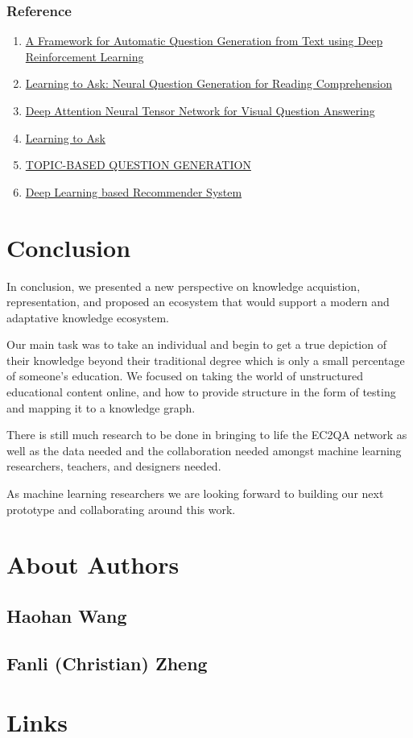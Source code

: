 \documentclass[]{book}
\theoremstyle{definition}
\theoremstyle{definition}
\theoremstyle{definition}
\theoremstyle{remark}
\begin{document}
\subsection{Reference}\label{reference}

\begin{enumerate}
\def\labelenumi{\arabic{enumi}.}
\item
  \href{https://arxiv.org/pdf/1808.04961.pdf}{A Framework for Automatic
  Question Generation from Text using Deep Reinforcement Learning}
\item
  \href{https://arxiv.org/pdf/1705.00106.pdf}{Learning to Ask: Neural
  Question Generation for Reading Comprehension}
\item
  \href{http://openaccess.thecvf.com/content_ECCV_2018/papers/Yalong_Bai_Deep_Attention_Neural_ECCV_2018_paper.pdf}{Deep
  Attention Neural Tensor Network for Visual Question Answering}
\item
  \href{http://www.cs.cornell.edu/~xdu/papers/acl17_dsc_poster.pdf}{Learning
  to Ask}
\item
  \href{https://openreview.net/pdf?id=rk3pnae0b}{TOPIC-BASED QUESTION
  GENERATION}
\item
  \href{https://arxiv.org/pdf/1707.07435.pdf}{Deep Learning based
  Recommender System}
\end{enumerate}

\chapter{Conclusion}\label{conclusion}

In conclusion, we presented a new perspective on knowledge acquistion,
representation, and proposed an ecosystem that would support a modern
and adaptative knowledge ecosystem.

Our main task was to take an individual and begin to get a true
depiction of their knowledge beyond their traditional degree which is
only a small percentage of someone's education. We focused on taking the
world of unstructured educational content online, and how to provide
structure in the form of testing and mapping it to a knowledge graph.

There is still much research to be done in bringing to life the EC2QA
network as well as the data needed and the collaboration needed amongst
machine learning researchers, teachers, and designers needed.

As machine learning researchers we are looking forward to building our
next prototype and collaborating around this work.

\chapter{About Authors}\label{about-authors}

\section{Haohan Wang}\label{haohan-wang}

\section{Fanli (Christian) Zheng}\label{fanli-christian-zheng}

\chapter{Links}\label{links}


\end{document}
